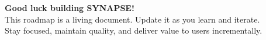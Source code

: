 \documentclass[12pt,oneside]{report}
\begin{document}
\vspace{1cm}

\begin{center}
\textbf{\Large Good luck building SYNAPSE!} \\
\vspace{0.5cm}
This roadmap is a living document. Update it as you learn and iterate. \\
Stay focused, maintain quality, and deliver value to users incrementally.
\end{center}
\end{document}
